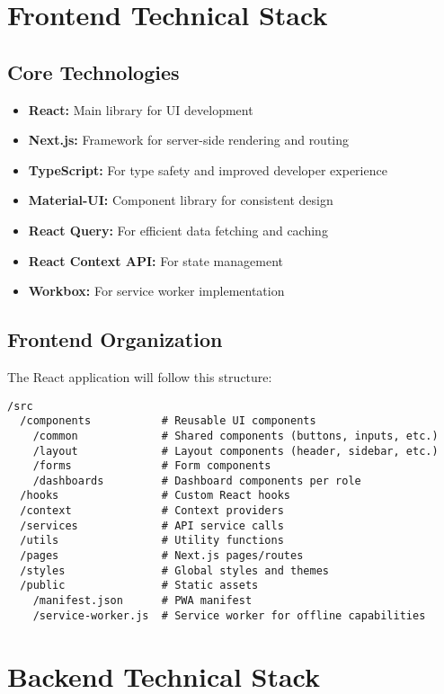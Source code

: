 \documentclass[11pt]{report}
\begin{document}
\section{Frontend Technical Stack}

\subsection{Core Technologies}
\begin{itemize}
    \item \textbf{React:} Main library for UI development
    \item \textbf{Next.js:} Framework for server-side rendering and routing
    \item \textbf{TypeScript:} For type safety and improved developer experience
    \item \textbf{Material-UI:} Component library for consistent design
    \item \textbf{React Query:} For efficient data fetching and caching
    \item \textbf{React Context API:} For state management
    \item \textbf{Workbox:} For service worker implementation
\end{itemize}

\subsection{Frontend Organization}
The React application will follow this structure:
\begin{verbatim}
/src
  /components           # Reusable UI components
    /common             # Shared components (buttons, inputs, etc.)
    /layout             # Layout components (header, sidebar, etc.)
    /forms              # Form components
    /dashboards         # Dashboard components per role
  /hooks                # Custom React hooks
  /context              # Context providers
  /services             # API service calls
  /utils                # Utility functions
  /pages                # Next.js pages/routes
  /styles               # Global styles and themes
  /public               # Static assets
    /manifest.json      # PWA manifest
    /service-worker.js  # Service worker for offline capabilities
\end{verbatim}

\section{Backend Technical Stack}
\end{document}
